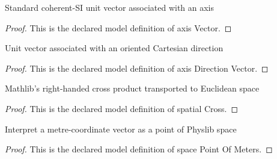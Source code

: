 \begin{definition}
  \label{def:physics:phyx-mini-0963:phyxminiproblems-problemphyxmini0963-axisvector}
  Standard coherent-SI unit vector associated with an axis
\end{definition}
\begin{proof}
  This is the declared model definition of axis Vector.
\end{proof}
\begin{definition}
  \label{def:physics:phyx-mini-0963:phyxminiproblems-problemphyxmini0963-axisdirectionvector}
  Unit vector associated with an oriented Cartesian direction
\end{definition}
\begin{proof}
  This is the declared model definition of axis Direction Vector.
\end{proof}
\begin{definition}
  \label{def:physics:phyx-mini-0963:phyxminiproblems-problemphyxmini0963-spatialcross}
  Mathlib's right-handed cross product transported to Euclidean space
\end{definition}
\begin{proof}
  This is the declared model definition of spatial Cross.
\end{proof}
\begin{definition}
  \label{def:physics:phyx-mini-0963:phyxminiproblems-problemphyxmini0963-spacepointofmeters}
  Interpret a metre-coordinate vector as a point of Physlib space
\end{definition}
\begin{proof}
  This is the declared model definition of space Point Of Meters.
\end{proof}
